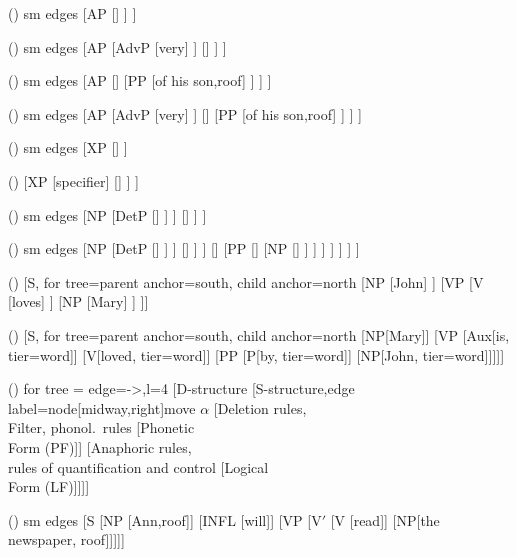 \begin {forest}()
 sm edges [AP [\abar [A [proud] ] ] ] \end {forest}
\begin {forest}()
 sm edges [AP [AdvP [very] ] [\abar [A [proud] ] ] ] \end {forest}
\begin {forest}()
 sm edges [AP [\abar [A [proud] ] [PP [of his son,roof] ] ] ] \end {forest}
\begin {forest}()
 sm edges [AP [AdvP [very] ] [\abar [A [proud] ] [PP [of his son,roof] ] ] ] \end {forest}
\begin {forest}()
 sm edges [XP [\xbar [X] ] ] \end {forest}
\begin {forest}()
 [XP [specifier] [\xbar [adjunct] [\xbar [complement] [X] ] ] ] \end {forest}
\begin {forest}()
 sm edges [NP [DetP [\detbar [Det [das;the] ] ] ] [\nbar [N [Bild;picture] ] ] ] \end {forest}
\begin {forest}()
 sm edges [NP [DetP [\detbar [Det [das;the] ] ] ] [\nbar [AP [\abar [A [schöne;beautiful] ] ] ] [\nbar [N [Bild;picture] ] [PP [\pbar [P [von;of] ] [NP [\nbar [N [Paris;Paris] ] ] ] ] ] ] ] ] \end {forest}
\begin {forest}()
 [S, for tree={parent anchor=south, child anchor=north} [NP [John] ] [VP [V [loves] ] [NP [Mary] ] ]] \end {forest}
\begin {forest}()
 [S, for tree={parent anchor=south, child anchor=north} [NP[Mary]] [VP [Aux[is, tier=word]] [V[loved, tier=word]] [PP [P[by, tier=word]] [NP[John, tier=word]]]]] \end {forest}
\begin {forest}()
 for tree = {edge={->},l=4\baselineskip } [D-structure [S-structure,edge label={node[midway,right]{move $\alpha $}} [Deletion rules{,}\\Filter{,} phonol.\ rules [Phonetic\\Form (PF)]] [Anaphoric rules{,}\\rules of quantification and control [Logical\\Form (LF)]]]] \end {forest}
\begin {forest}()
 sm edges [S [NP [Ann,roof]] [INFL [will]] [VP [V$'$ [V [read]] [NP[the newspaper, roof]]]]] \end {forest}
